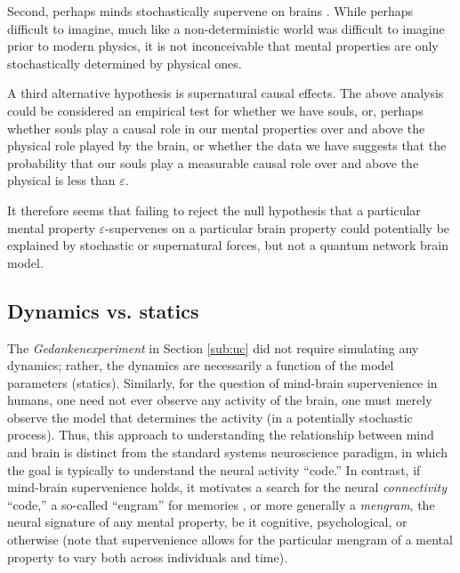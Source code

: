 \documentclass{article}
\newcommand{\eps}{\varepsilon}
\begin{document}
Second, perhaps minds stochastically supervene on brains \cite{Craver09}. While perhaps difficult to imagine, 
much like a non-deterministic world was difficult to imagine prior to modern physics, it is not inconceivable that mental properties are only stochastically determined by physical ones.

A third alternative hypothesis is supernatural causal effects.  The above analysis could be considered an empirical test for whether we have souls, or, perhaps whether souls play a causal role in our mental properties over and above the physical role played by the brain, or whether the data we have suggests that the probability that our souls play a measurable causal role over and above the physical is less than $\eps$.

It therefore seems that failing to reject the null hypothesis that a particular mental property $\eps$-supervenes on a particular brain property could potentially be explained by stochastic or supernatural forces, but not a quantum network brain model.



\subsection{Dynamics vs. statics} %
\label{par:dynamics_vs_statics}

The \emph{Gedankenexperiment} in Section \ref{sub:uc} did not require simulating any dynamics; rather, the dynamics are necessarily a function of the model parameters (statics).  Similarly, for the question of mind-brain supervenience in humans, one need not ever observe any activity of the brain, one must merely observe the model that determines the activity (in a potentially stochastic process). Thus, this approach to understanding the relationship between mind and brain is distinct from the standard systems neuroscience paradigm, in which the goal is typically to understand the neural activity ``code.''  In contrast, if mind-brain supervenience holds, it motivates a search for the neural \emph{connectivity} ``code,'' a so-called ``engram''  for memories \cite{Semon21, Lashley50, ZhangLinden03, ShemaDudai07, BerryDavis08}, or more generally a \emph{mengram}, the neural signature of any mental property, be it cognitive, psychological, or otherwise (note that supervenience allows for the particular mengram of a mental property to vary both across individuals and time).  

\end{document}
